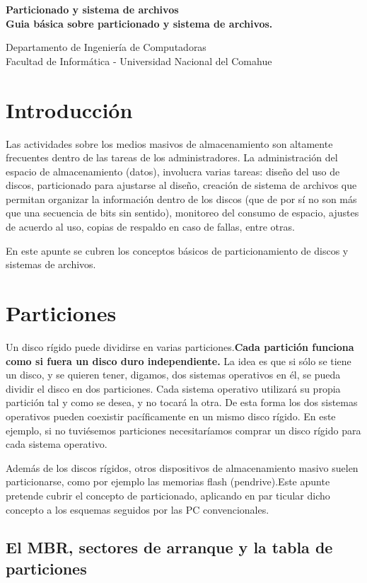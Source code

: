 \documentclass[12pt]{article}
\def\maketitle{

 \makeatletter
 {\color{bl} \centering \huge \sc \textbf{
 Particionado y sistema de archivos \\ 
\large \vspace*{-8pt} \color{black} Guia básica sobre particionado y sistema de archivos.
 \vspace*{8pt} }\par}
 \makeatother


 \makeatletter
 {\centering \small 
 	Departamento de Ingeniería de Computadoras \\
 	Facultad de Informática - Universidad Nacional del Comahue \\
 	\vspace{20pt} }
 \makeatother

}
\begin{document}
\thispagestyle{empty}
\maketitle
\setlength{\parindent}{0pt}

\section*{Introducción}

Las actividades sobre los medios masivos de almacenamiento son altamente 
frecuentes dentro de las tareas de los administradores. La administración 
del espacio de almacenamiento (datos), involucra varias tareas: diseño 
del uso de discos, particionado para ajustarse al diseño, creación de 
sistema de archivos que permitan organizar la información dentro de los
discos (que de por sí no son más que una secuencia de bits sin sentido),
monitoreo del consumo de espacio, ajustes de acuerdo al uso, copias de 
respaldo en caso de fallas, entre otras. 

En este apunte se cubren los conceptos básicos de particionamiento de 
discos y sistemas de archivos.  

\section*{Particiones}

Un disco rígido puede dividirse en varias particiones.{\bf Cada partición 
funciona como si fuera un disco duro independiente.} 
La idea es que si sólo se tiene un disco, y se quieren tener, digamos,
 dos sistemas operativos en él, se pueda dividir 
el disco en dos particiones. Cada sistema operativo utilizará su propia 
partición tal y como se desea, y no tocará 
la otra. De esta forma los dos sistemas operativos pueden coexistir 
pacíficamente en un mismo disco rígido. En este ejemplo, si no tuviésemos
particiones necesitaríamos comprar un disco rígido para cada sistema 
operativo.

Además de los discos rígidos, otros dispositivos de almacenamiento 
masivo suelen particionarse, como por ejemplo las memorias flash (pendrive).Este apunte pretende cubrir el concepto de particionado, aplicando en par
ticular dicho concepto a los esquemas seguidos por las PC convencionales.  


\subsection*{El MBR, sectores de arranque y la tabla de particiones}
\end{document}
